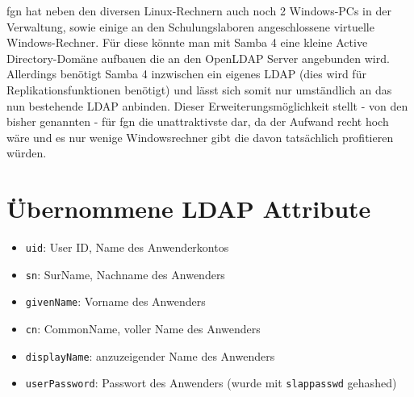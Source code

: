 \documentclass[11pt,a4paper,titlepage=firstiscover,headsepline,bibtotoc]{scrartcl} %
\begin{document}
fgn hat neben den diversen Linux-Rechnern auch noch 2 Windows-PCs in der Verwaltung, sowie einige an den Schulungslaboren angeschlossene virtuelle Windows-Rechner. Für diese könnte man mit Samba 4 eine kleine Active Directory-Domäne aufbauen die an den OpenLDAP Server angebunden wird. Allerdings benötigt Samba 4 inzwischen ein eigenes LDAP (dies wird für Replikationsfunktionen benötigt) und lässt sich somit nur umständlich an das nun bestehende LDAP anbinden. Dieser Erweiterungsmöglichkeit stellt - von den bisher genannten - für fgn die unattraktivste dar, da der Aufwand recht hoch wäre und es nur wenige Windowsrechner gibt die davon tatsächlich profitieren würden.


\appendix
\newpage
{} %
\section{Übernommene LDAP Attribute} \label{sec:LDAP-Attribute}
\begin{itemize}
\item\texttt{uid}: User ID, Name des Anwenderkontos
\item\texttt{sn}: SurName, Nachname des Anwenders
\item\texttt{givenName}: Vorname des Anwenders
\item\texttt{cn}: CommonName, voller Name des Anwenders
\item\texttt{displayName}: anzuzeigender Name des Anwenders
\item\texttt{userPassword}: Passwort des Anwenders (wurde mit \texttt{slappasswd} gehashed)
\end{itemize}

\newpage
\end{document}
